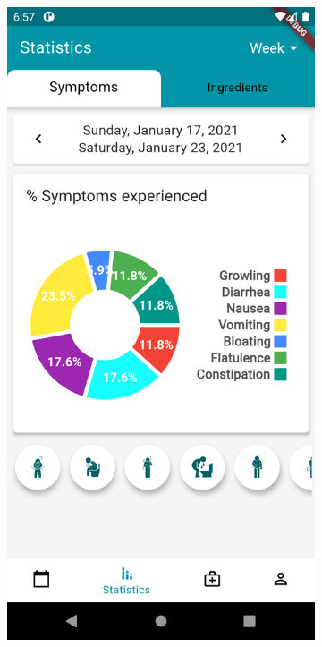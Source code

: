 \documentclass [12pt]{article}
\begin{document}
\begin{description}[leftmargin=1cm,rightmargin=1cm]
\item [ 2)Visualize statistics]
\
\
\
\begin{figure}[h!]
\centering
\hspace*{\fill}
\begin{subfigure}[tl]{0.3\linewidth}
\includegraphics[width=\linewidth]{statistics1.PNG}

\end{subfigure}
\end{figure}
\end{description}
\end{document}
